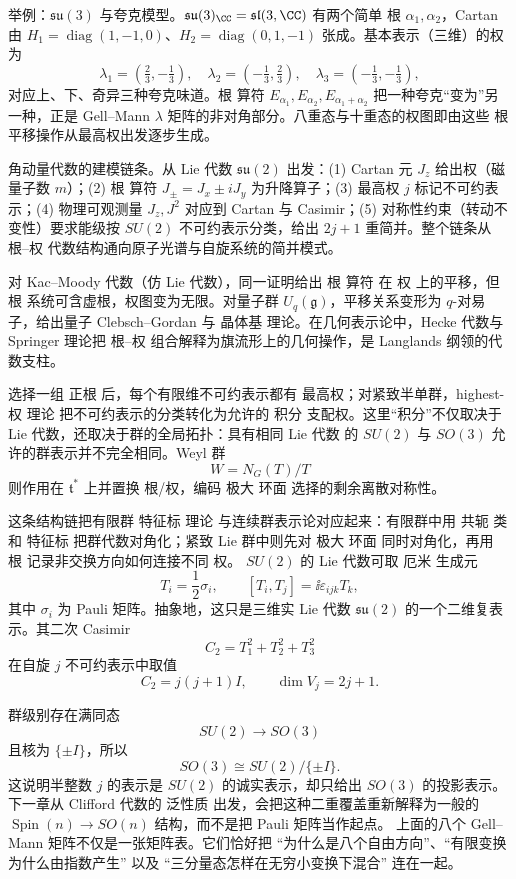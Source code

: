 举例：$\mathfrak{su}(3)$ 与夸克模型。$\mathfrak{su}(3)_\CC=\mathfrak{sl}(3,\CC)$ 有两个简单 根 $\alpha_1,\alpha_2$，Cartan 由 $H_1=\operatorname{diag}(1,-1,0)$、$H_2=\operatorname{diag}(0,1,-1)$ 张成。基本表示（三维）的权为
\[
\lambda_1=(\tfrac23,-\tfrac13),\quad
\lambda_2=(-\tfrac13,\tfrac23),\quad
\lambda_3=(-\tfrac13,-\tfrac13),
\]
对应上、下、奇异三种夸克味道。根 算符 $E_{\alpha_1},E_{\alpha_2},E_{\alpha_1+\alpha_2}$ 把一种夸克“变为”另一种，正是 Gell--Mann $\lambda$ 矩阵的非对角部分。八重态与十重态的权图即由这些 根 平移操作从最高权出发逐步生成。

角动量代数的建模链条。从 Lie 代数 $\mathfrak{su}(2)$ 出发：(1) Cartan 元 $J_z$ 给出权（磁量子数 $m$）；(2) 根 算符 $J_\pm=J_x\pm iJ_y$ 为升降算子；(3) 最高权 $j$ 标记不可约表示；(4) 物理可观测量 $J_z,J^2$ 对应到 Cartan 与 Casimir；(5) 对称性约束（转动不变性）要求能级按 $SU(2)$ 不可约表示分类，给出 $2j+1$ 重简并。整个链条从 根--权 代数结构通向原子光谱与自旋系统的简并模式。

对 Kac--Moody 代数（仿 Lie 代数），同一证明给出 根 算符 在 权 上的平移，但 根 系统可含虚根，权图变为无限。对量子群 $U_q(\mathfrak g)$，平移关系变形为 $q$-对易子，给出量子 Clebsch--Gordan 与 晶体基 理论。在几何表示论中，Hecke 代数与 Springer 理论把 根--权 组合解释为旗流形上的几何操作，是 Langlands 纲领的代数支柱。

选择一组 正根 后，每个有限维不可约表示都有 最高权；对紧致半单群，highest-权 理论 把不可约表示的分类转化为允许的 积分 支配权。这里“积分”不仅取决于 Lie 代数，还取决于群的全局拓扑：具有相同 Lie 代数 的 $SU(2)$ 与 $SO(3)$ 允许的群表示并不完全相同。Weyl 群
\[
W=N_G(T)/T
\]
则作用在 $\mathfrak t^*$ 上并置换 根/权，编码 极大 环面 选择的剩余离散对称性。

这条结构链把有限群 特征标 理论 与连续群表示论对应起来：有限群中用 共轭 类 和 特征标 把群代数对角化；紧致 Lie 群中则先对 极大 环面 同时对角化，再用 根 记录非交换方向如何连接不同 权。
$SU(2)$ 的 Lie 代数可取 厄米 生成元
\[
T_i=\frac12\sigma_i,
\qquad
[T_i,T_j]=\ii\varepsilon_{ijk}T_k,
\]
其中 $\sigma_i$ 为 Pauli 矩阵。抽象地，这只是三维实 Lie 代数 $\mathfrak{su}(2)$ 的一个二维复表示。其二次 Casimir
\[
C_2=T_1^2+T_2^2+T_3^2
\]
在自旋 $j$ 不可约表示中取值
\[
C_2=j(j+1)I,
\qquad
\dim V_j=2j+1.
\]

群级别存在满同态
\[
SU(2)\longrightarrow SO(3)
\]
且核为 $\{\pm I\}$，所以
\[
SO(3)\cong SU(2)/\{\pm I\}.
\]
这说明半整数 $j$ 的表示是 $SU(2)$ 的诚实表示，却只给出 $SO(3)$ 的投影表示。下一章从 Clifford 代数的 泛性质 出发，会把这种二重覆盖重新解释为一般的 $\operatorname{Spin}(n)\to SO(n)$ 结构，而不是把 Pauli 矩阵当作起点。
上面的八个 Gell--Mann 矩阵不仅是一张矩阵表。它们恰好把 ``为什么是八个自由方向''、``有限变换为什么由指数产生'' 以及 ``三分量态怎样在无穷小变换下混合'' 连在一起。

